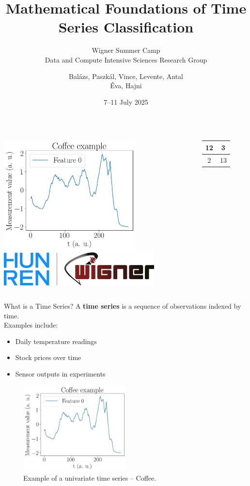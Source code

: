 \documentclass{beamer}
\title{Mathematical Foundations of Time Series Classification}
\subtitle{Wigner Summer Camp \\ Data and Compute Intensive Sciences Research Group}
\author{Bal\'azs, Paszk\'al, Vince, Levente, Antal \\ \'{E}va, Hajni}
\date{7--11 July 2025}
\begin{document}
\begin{frame}
  \titlepage
  \begin{columns}
    \centering
    \includegraphics[width=0.7\textwidth]{img/Coffee_example.png}
    \centering
    \includegraphics[width=0.8\textwidth]{img/logo.png}
          \begin{tabular}{|c|c|}
        \hline
          12 & 3 \\ \hline
          2 &  13 \\ \hline
      \end{tabular}
    \centering
  \end{columns}
\end{frame}

\begin{frame}{What is a Time Series?}
  A \textbf{time series} is a sequence of observations indexed by time.
  \\[1em]
  Examples include:
  \begin{itemize}
    \item Daily temperature readings
    \item Stock prices over time
    \item Sensor outputs in experiments
  \end{itemize}
  \begin{figure}[h]
    \centering
    \includegraphics[width=0.5\textwidth]{img/Coffee_example.png}
    \caption{Example of a univariate time series -- Coffee\cite{CoffeeDataset1996}.}
  \end{figure}
\end{frame}
\end{document}
